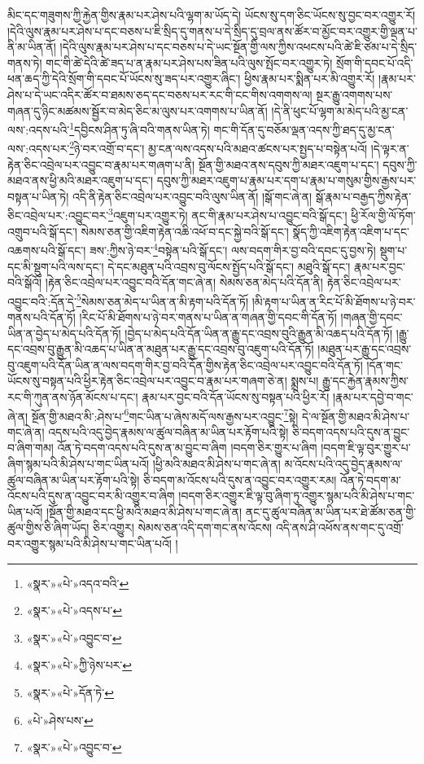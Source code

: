 མིང་དང་གཟུགས་ཀྱི་རྐྱེན་གྱིས་རྣམ་པར་ཤེས་པའི་ལྷག་མ་ཡོད་དེ། ཡོངས་སུ་དག་ཅིང་ཡོངས་སུ་བྱང་བར་འགྱུར་རོ། །དེའི་ལུས་རྣམ་པར་ཤེས་པ་དང་བཅས་པ་ཇི་སྲིད་དུ་གནས་པ་དེ་སྲིད་དུ་བྲལ་ནས་ཚོར་བ་མྱོང་བར་འགྱུར་གྱི་ལྡན་པ་ནི་མ་ཡིན་ནོ། །དེའི་ལུས་རྣམ་པར་ཤེས་པ་དང་བཅས་པ་དེ་ཡང་སྔོན་གྱི་ལས་ཀྱིས་འཕངས་པའི་ཚེ་ཇི་ཙམ་པ་དེ་སྲིད་གནས་ཏེ། གང་གི་ཚེ་དེའི་ཚེ་ཟད་པ་ན་རྣམ་པར་ཤེས་པས་ཟིན་པའི་ལུས་སྤོང་བར་འགྱུར་ཏེ། སྲོག་གི་དབང་པོ་འདི་ཕན་ཆད་ཀྱི་དེའི་སྲོག་གི་དབང་པོ་ཡོངས་སུ་ཟད་པར་འགྱུར་ཞིང་། ཕྱིས་རྣམ་པར་སྨིན་པར་མི་འགྱུར་རོ། །རྣམ་པར་ཤེས་པ་དེ་ཡང་འདིར་ཚོར་བ་ཐམས་ཅད་དང་བཅས་པར་རང་གི་ངང་གིས་འགགས་ལ། སྔར་རྒྱུ་འགགས་པས་གཞན་དུ་ཉིང་མཚམས་སྦྱོར་བ་མེད་ཅིང་མ་ལུས་པར་འགགས་པ་ཡིན་ནོ། །དེ་ནི་ཕུང་པོ་ལྷག་མ་མེད་པའི་མྱ་ངན་ལས་:འདས་པའི་\footnote{«སྣར་»«པེ་»འདའ་བའི་}དབྱིངས་ཤིན་ཏུ་ཞི་བའི་གནས་ཡིན་ཏེ། གང་གི་དོན་དུ་བཅོམ་ལྡན་འདས་ཀྱི་ཐད་དུ་མྱ་ངན་ལས་:འདས་པར་\footnote{«སྣར་»«པེ་»འདས་པ་}ཉེ་བར་འགྲོ་བ་དང་། མྱ་ངན་ལས་འདས་པའི་མཐའ་ཚངས་པར་སྤྱད་པ་བསྟེན་པའོ། །དེ་ལྟར་ན་རྟེན་ཅིང་འབྲེལ་པར་འབྱུང་བ་རྣམ་པར་གཞག་པ་ནི། སྔོན་གྱི་མཐའ་ནས་དབུས་ཀྱི་མཐར་འཇུག་པ་དང་། དབུས་ཀྱི་མཐའ་ནས་ཕྱི་མའི་མཐར་འཇུག་པ་དང་། དབུས་ཀྱི་མཐར་འཇུག་པ་རྣམ་པར་དག་པ་རྣམ་པ་གསུམ་གྱིས་རྒྱས་པར་བསྟན་པ་ཡིན་ཏེ། འདི་ནི་རྟེན་ཅིང་འབྲེལ་པར་འབྱུང་བའི་ལུས་ཡིན་ནོ། །སྒོ་གང་ཞེ་ན། སྒོ་རྣམ་པ་བརྒྱད་ཀྱིས་རྟེན་ཅིང་འབྲེལ་པར་:འབྱུང་བར་\footnote{«སྣར་»«པེ་»འབྱུང་བ་}འཇུག་པར་འགྱུར་ཏེ། ནང་གི་རྣམ་པར་ཤེས་པ་འབྱུང་བའི་སྒོ་དང་། ཕྱི་རོལ་གྱི་ལོ་ཏོག་འགྲུབ་པའི་སྒོ་དང་། སེམས་ཅན་གྱི་འཇིག་རྟེན་འཆི་འཕོ་བ་དང་སྐྱེ་བའི་སྒོ་དང་། སྣོད་ཀྱི་འཇིག་རྟེན་འཇིག་པ་དང་འཆགས་པའི་སྒོ་དང་། ཟས་:ཀྱིས་ཉེ་བར་\footnote{«སྣར་»«པེ་»ཀྱི་ཉེས་པར་}བསྟེན་པའི་སྒོ་དང་། ལས་བདག་གིར་བྱ་བའི་དབང་དུ་བྱས་ཏེ། སྡུག་པ་དང་མི་སྡུག་པའི་ལས་དང་། དེ་དང་མཐུན་པའི་འབྲས་བུ་ལོངས་སྤྱོད་པའི་སྒོ་དང་། མཐུའི་སྒོ་དང་། རྣམ་པར་བྱང་བའི་སྒོའོ། །རྟེན་ཅིང་འབྲེལ་པར་འབྱུང་བའི་དོན་གང་ཞེ་ན། སེམས་ཅན་མེད་པའི་དོན་ནི། རྟེན་ཅིང་འབྲེལ་པར་འབྱུང་བའི་:དོན་དེ་\footnote{«སྣར་»«པེ་»དོན་ཏེ་}སེམས་ཅན་མེད་པ་ཡིན་ན་མི་རྟག་པའི་དོན་ཏོ། །མི་རྟག་པ་ཡིན་ན་རིང་པོ་མི་ཐོགས་པ་ཉེ་བར་གནས་པའི་དོན་ཏོ། །རིང་པོ་མི་ཐོགས་པ་ཉེ་བར་གནས་པ་ཡིན་ན་གཞན་གྱི་དབང་གི་དོན་ཏོ། །གཞན་གྱི་དབང་ཡིན་ན་བྱེད་པ་མེད་པའི་དོན་ཏོ། །བྱེད་པ་མེད་པའི་དོན་ཡིན་ན་རྒྱུ་དང་འབྲས་བུའི་རྒྱུན་མི་འཆད་པའི་དོན་ཏོ། །རྒྱུ་དང་འབྲས་བུ་རྒྱུན་མི་འཆད་པ་ཡིན་ན་མཐུན་པར་རྒྱུ་དང་འབྲས་བུ་འཇུག་པའི་དོན་ཏོ། །མཐུན་པར་རྒྱུ་དང་འབྲས་བུ་འཇུག་པའི་དོན་ཡིན་ན་ལས་བདག་གིར་བྱ་བའི་དོན་གྱིས་རྟེན་ཅིང་འབྲེལ་པར་འབྱུང་བའི་དོན་ཏོ། །དོན་གང་ཡོངས་སུ་བསྟན་པའི་ཕྱིར་རྟེན་ཅིང་འབྲེལ་པར་འབྱུང་བ་རྣམ་པར་གཞག་ཅེ་ན། སྨྲས་པ། རྒྱུ་དང་རྐྱེན་རྣམས་ཀྱིས་རང་གི་ཀུན་ནས་ཉོན་མོངས་པ་དང་། རྣམ་པར་བྱང་བའི་དོན་ཡོངས་སུ་བསྟན་པའི་ཕྱིར་རོ། །རྣམ་པར་དབྱེ་བ་གང་ཞེ་ན། སྔོན་གྱི་མཐའ་མི་:ཤེས་པ་\footnote{«པེ་»ཤེས་པས་}གང་ཡིན་པ་ཞེས་མདོ་ལས་རྒྱས་པར་འབྱུང་\footnote{«སྣར་»«པེ་»འབྱུང་བ་}སྟེ། དེ་ལ་སྔོན་གྱི་མཐའ་མི་ཤེས་པ་གང་ཞེ་ན། འདས་པའི་འདུ་བྱེད་རྣམས་ལ་ཚུལ་བཞིན་མ་ཡིན་པར་རྟོག་པའི་སྟེ། ཅི་བདག་འདས་པའི་དུས་ན་བྱུང་བ་ཞིག་གམ། འོན་ཏེ་བདག་འདས་པའི་དུས་ན་མ་བྱུང་བ་ཞིག །བདག་ཅིར་གྱུར་པ་ཞིག །བདག་ཇི་ལྟ་བུར་གྱུར་པ་ཞིག་སྙམ་པའི་མི་ཤེས་པ་གང་ཡིན་པའོ། །ཕྱི་མའི་མཐའ་མི་ཤེས་པ་གང་ཞེ་ན། མ་འོངས་པའི་འདུ་བྱེད་རྣམས་ལ་ཚུལ་བཞིན་མ་ཡིན་པར་རྟོག་པའི་སྟེ། ཅི་བདག་མ་འོངས་པའི་དུས་ན་འབྱུང་བར་འགྱུར་རམ། འོན་ཏེ་བདག་མ་འོངས་པའི་དུས་ན་འབྱུང་བར་མི་འགྱུར་བ་ཞིག །བདག་ཅིར་འགྱུར་ཇི་ལྟ་བུ་ཞིག་ཏུ་འགྱུར་སྙམ་པའི་མི་ཤེས་པ་གང་ཡིན་པའོ། །སྔོན་གྱི་མཐའ་དང་ཕྱི་མའི་མཐའ་མི་ཤེས་པ་གང་ཞེ་ན། ནང་དུ་ཚུལ་བཞིན་མ་ཡིན་པར་ཐེ་ཚོམ་ཅན་གྱི་ཚུལ་གྱིས་ཅི་ཞིག་ཡོད། ཅིར་འགྱུར། སེམས་ཅན་འདི་དག་གང་ནས་འོངས། འདི་ནས་ཤི་འཕོས་ནས་གང་དུ་འགྲོ་བར་འགྱུར་སྙམ་པའི་མི་ཤེས་པ་གང་ཡིན་པའོ། །
